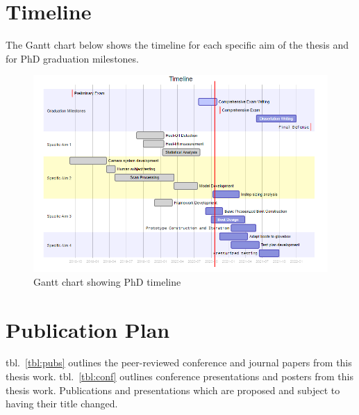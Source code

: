 \documentclass[defaultstyle,11pt]{comps}
\begin{document}
\hypertarget{timeline}{%
\section{Timeline}\label{timeline}}

The Gantt chart below shows the timeline for each specific aim of the thesis and for PhD graduation milestones.

\begin{figure}
\centering
\includegraphics{../fig/Gantt.png}
\caption{Gantt chart showing PhD timeline}
\end{figure}

\hypertarget{publication-plan}{%
\section{Publication Plan}\label{publication-plan}}

tbl.~\ref{tbl:pubs} outlines the peer-reviewed conference and journal papers from this thesis work.
tbl.~\ref{tbl:conf} outlines conference presentations and posters from this thesis work.
Publications and presentations which are proposed and subject to having their title changed.
\end{document}
